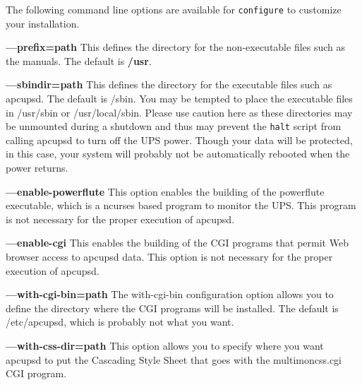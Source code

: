 The following command line options are available for {\tt configure} to
customize your installation. 
\label{index-options_002c-_002d_002d_002dprefix-26}

\begin{description}

\item {\bf {---}prefix=\lt{}path\gt{}}
This defines the directory for the non-executable files such as the manuals.
The default is {\bf /usr}.  

\label{index-options_002c-_002d_002d_002dsbindir-27}

\item {\bf {---}sbindir=\lt{}path\gt{}}
This defines the directory for the executable files such as apcupsd. The
default is /sbin. You may be tempted to place the executable files in
/usr/sbin or /usr/local/sbin. Please use caution here as these directories may
be unmounted during a shutdown and thus may prevent the {\tt halt} script from
calling apcupsd to turn off the UPS power. Though your data will be protected,
in this case, your system will probably not be automatically rebooted when the
power returns.  

\label{index-options_002c-_002d_002d_002denable_002dpowerflute-28}

\item {\bf {---}enable-powerflute}
This option enables the building of the powerflute executable, which is a
ncurses based program to monitor the UPS. This program is not necessary for
the proper execution of apcupsd.  

\label{index-options_002c-_002d_002d_002denable_002dcgi-29}

\item {\bf {---}enable-cgi}
This enables the building of the CGI programs that permit Web browser access
to apcupsd data. This option is not necessary for the proper execution of
apcupsd.  

\item {\bf {---}with-cgi-bin=\lt{}path\gt{}}
The with-cgi-bin configuration option allows you to define the directory where
the CGI programs will be installed. The default is /etc/apcupsd, which is
probably not what you want.  

\item {\bf {---}with-css-dir=\lt{}path\gt{}}
This option allows you to specify where you want apcupsd to put the Cascading
Style Sheet that goes with the multimoncss.cgi CGI program.  


\end{description}
